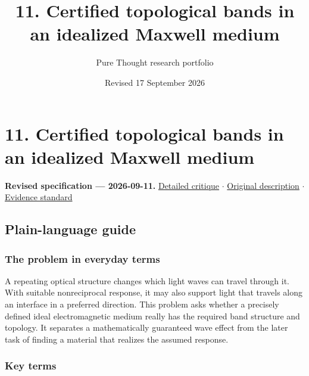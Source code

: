 \documentclass[
  11pt,
]{article}
\title{11. Certified topological bands in an idealized Maxwell medium}
\author{Pure Thought research portfolio}
\date{Revised 17 September 2026}
\begin{document}
\maketitle
\thispagestyle{empty}
\clearpage

\section{11. Certified topological bands in an idealized Maxwell medium}

\textbf{Revised specification --- 2026-09-11.}
\href{https://github.com/rick-stevens-ai/Pure-Thought/blob/main/reviews/11-Photonic-Topological-Crystals.md}{Detailed
critique} \ensuremath{\cdot}
\href{https://github.com/rick-stevens-ai/Pure-Thought/blob/main/archive/original-PRDs/11-Photonic-Topological-Crystals.md}{Original
description} \ensuremath{\cdot}
\href{https://github.com/rick-stevens-ai/Pure-Thought/blob/main/reviews/EVIDENCE-STANDARD.md}{Evidence
standard}

\subsection{Plain-language guide}

\subsubsection{The problem in everyday terms}

A repeating optical structure changes which light waves can travel
through it. With suitable nonreciprocal response, it may also support
light that travels along an interface in a preferred direction. This
problem asks whether a precisely defined ideal electromagnetic medium
really has the required band structure and topology. It separates a
mathematically guaranteed wave effect from the later task of finding a
material that realizes the assumed response.

\subsubsection{Key terms}
\end{document}
